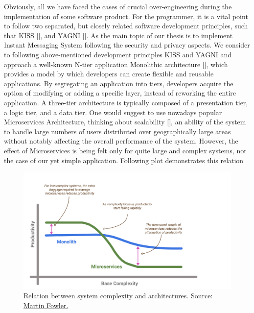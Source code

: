 Obviously, all we have faced the cases of crucial over-engineering during the implementation of some
software product.
For the programmer, it is a vital point to follow two separated, but closely related software development principles,
such that KISS [\cite{alwin2016kiss}], and YAGNI [\cite{da2018evolution}].
As the main topic of our thesis is to implement Instant Messaging System following the security and privacy aspects.
We consider to following above-mentioned development principles KISS and YAGNI and approach
a well-known N-tier application Monolithic architecture [\cite{bucchiarone2018monolithic}], which provides a model by which developers can
create flexible and reusable applications.
By segregating an application into tiers, developers acquire the option of modifying or adding a specific layer,
instead of reworking the entire application.
A three-tier architecture is typically composed of a presentation tier, a logic tier, and a data tier.
One would suggest to use nowadays popular Microservices Architecture, thinking about scalability [\cite{brataas2004exploring}],
an ability of the system to handle large numbers of users distributed over geographically large areas without
notably affecting the overall performance of the system.
However, the effect of Microservices is being felt only for quite large and complex systems,
not the case of our yet simple application.
Following plot demonstrates this relation

\begin{figure}[H]
    \centering
    \includegraphics[width=1\textwidth]{Pictures/Monolith_vs_Microservice.pdf}
    \caption{Relation between system complexity and architectures.
    Source: \href{https://martinfowler.com/bliki/MicroservicePremium.html}{Martin Fowler.}}
    \label{fig:monolith_vs_microservice}
\end{figure}

